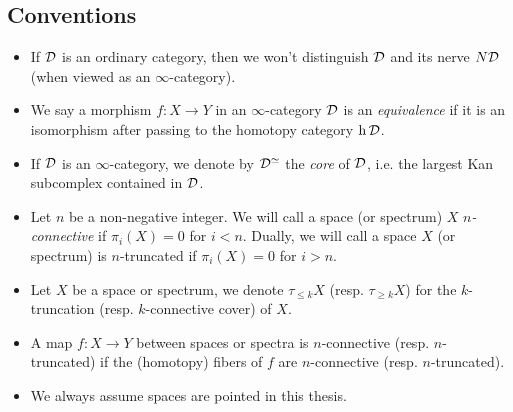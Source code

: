 \subsection{Conventions}
\begin{itemize}
	\item If ${\mathcal{D}}$ is an ordinary category, then we won't distinguish ${\mathcal{D}}$ and its nerve $N{\mathcal{D}}$ (when viewed as an $\infty$-category).
	\item We say a morphism $f:X\rightarrow Y$ in an $\infty$-category ${\mathcal{D}}$ is an \emph{equivalence} if it is an isomorphism after passing to the homotopy category $\operatorname{h}{\mathcal{D}}$.
    \item If ${\mathcal{D}}$ is an $\infty$-category, we denote by ${\mathcal{D}}^{\simeq}$ the \emph{core} of ${\mathcal{D}}$, i.e. the largest Kan subcomplex contained in ${\mathcal{D}}$.  
    \item Let $n$ be a non-negative integer. 
    We will call a space (or spectrum) $X$ \emph{$n$-connective} if $\pi_i(X)=0$ for $i <n$. Dually, we will call a space $X$ (or spectrum) is $n$-truncated if $\pi_i(X)=0$ for $i >n$.
    \item Let $X$ be a space or spectrum, we denote $\tau_{\leq k}X$ (resp. $\tau_{\geq k}X$) for the $k$-truncation (resp. $k$-connective cover) of $X$.
    \item A map $f: X \to Y$ between spaces or spectra is $n$-connective (resp. $n$-truncated) if the (homotopy) fibers of $f$ are $n$-connective (resp. $n$-truncated).
    \item We always assume spaces are pointed in this thesis.
\end{itemize}

